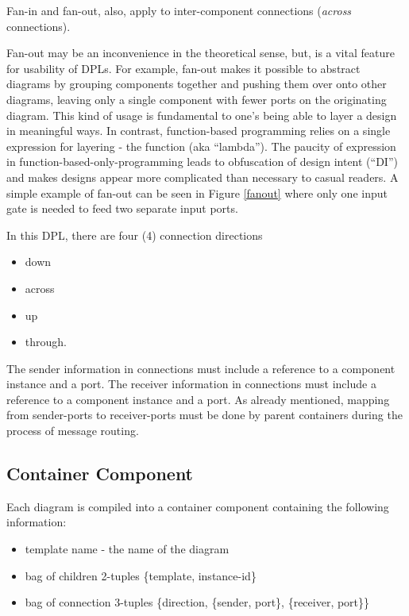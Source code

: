 \documentclass[10pt,anonymous,review]{acmart}
\begin{document}
Fan-in and fan-out, also, apply to inter-component connections (\emph{across} connections).

Fan-out may be an inconvenience in the theoretical sense, but, is a vital feature for usability of DPLs. For example, fan-out makes it possible to abstract diagrams by grouping components together and pushing them over onto other diagrams, leaving only a single component with fewer ports on the originating diagram. This kind of usage is fundamental to one’s being able to layer a design in meaningful ways. In contrast, function-based programming relies on a single expression for layering - the function (aka “lambda”). The paucity of expression in function-based-only-programming leads to obfuscation of design intent (“DI”) and makes designs appear more complicated than necessary to casual readers. A simple example of fan-out can be seen in Figure \ref{fanout} where only one input gate is needed to feed two separate input ports.




In this DPL, there are four (4) connection directions
\begin{itemize}
\item down
\item across
\item up
\item through.
\end{itemize}
The sender information in connections must include a reference to a component instance and a port.
The receiver information in connections must include a reference to a component instance and a port.
As already mentioned, mapping from sender-ports to receiver-ports must be done by parent containers during the process of message routing.
\subsection{Container Component}
Each diagram is compiled into a container component containing the following information:
\begin{itemize}
\item template name - the name of the diagram
\item bag of children 2-tuples \{template, instance-id\}
\item bag of connection 3-tuples \{direction, \{sender, port\}, \{receiver, port\}\}
\end{itemize}
\end{document}
